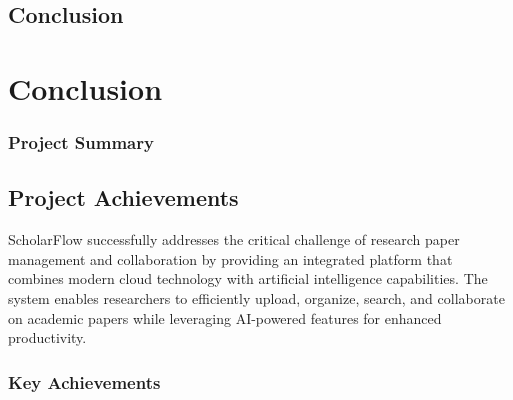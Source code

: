 \section{Conclusion}\chapter{Conclusion}

\label{sec:conclusion}\label{ch:conclusion}



\subsection{Project Summary}\section{Project Achievements}

\label{sec:conclusion-achievements}

ScholarFlow successfully addresses the critical challenge of research paper management and collaboration by providing an integrated platform that combines modern cloud technology with artificial intelligence capabilities. The system enables researchers to efficiently upload, organize, search, and collaborate on academic papers while leveraging AI-powered features for enhanced productivity.


\subsection{Key Achievements}

